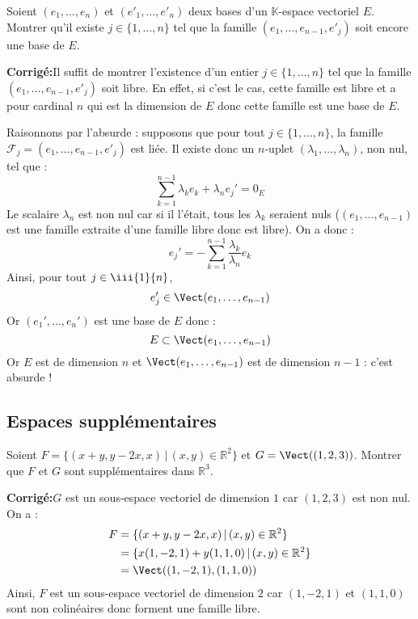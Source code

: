 \documentclass[a4paper,twoside,french,10pt]{VcCours}
\newcommand{\corr}{\textbf{Corrigé:}}
\begin{document}
\medskip

\begin{Exercice}{} Soient $(e_1 , \ldots ,e_n)$ et $(e'_1 , \ldots ,e'_n)$ deux bases d'un $\mathbb{K}$-espace vectoriel $E$. Montrer qu'il existe $j \in \lbrace 1, \ldots ,n \rbrace$ tel que la famille $(e_1 , \ldots ,e_{n - 1} ,e'_j)$ soit encore une base de $E$.
\end{Exercice}

\corr Il suffit de montrer l'existence d'un entier $j \in \lbrace 1, \ldots ,n \rbrace$ tel que la famille $(e_1 , \ldots ,e_{n - 1} ,e'_j)$ soit libre. En effet, si c'est le cas, cette famille est libre et a pour cardinal $n$ qui est la dimension de $E$ donc cette famille est une base de $E$.

\medskip

Raisonnons par l'absurde : supposons que pour tout $j \in \lbrace 1, \ldots ,n \rbrace$, la famille $\mathcal{F}_j=(e_1 , \ldots ,e_{n - 1} ,e'_j)$ est liée. Il existe donc un $n$-uplet $(\lambda_1, \ldots, \lambda_n)$, non nul, tel que :
$$ \sum_{k=1}^{n-1} \lambda_k e_k + \lambda_n e_j' = 0_E$$
Le scalaire $\lambda_n$ est non nul car si il l'était, tous les $\lambda_k$ seraient nuls ($(e_1, \ldots, e_{n-1})$ est une famille extraite d'une famille libre donc est libre). On a donc :
$$ e_j' = - \sum_{k=1}^{n-1} \dfrac{\lambda_k}{\lambda_n} e_k$$
Ainsi, pour tout $j \in \iii{1}{n}$,
$$ e_j' \in \Vect(e_1, \ldots, e_{n-1})$$
Or $(e_1', \ldots, e_n')$ est une base de $E$ donc :
$$ E \subset \Vect(e_1, \ldots, e_{n-1})$$
Or $E$ est de dimension $n$ et $\Vect(e_1, \ldots, e_{n-1})$ est de dimension $n-1$ : c'est absurde !

\medskip



\subsection{\large Espaces supplémentaires}

\medskip

\begin{Exercice}{} Soient $F= \lbrace (x+y,y-2x, x) \, \vert \,  (x,y) \in \mathbb{R}^2 \rbrace$ et $G = \Vect((1,2,3))$. Montrer que $F$ et $G$ sont supplémentaires dans $\mathbb{R}^3$.
\end{Exercice} 

\corr $G$ est un sous-espace vectoriel de dimension $1$ car $(1,2,3)$ est non nul. On a :
\begin{align*}
F & = \lbrace (x+y,y-2x, x) \, \vert \,  (x,y) \in \mathbb{R}^2 \rbrace \\
& = \lbrace x (1,-2,1) + y (1,1,0) \, \vert \, (x,y) \in \mathbb{R}^2 \rbrace \\
& = \Vect((1,-2,1),(1,1,0)) 
\end{align*}
Ainsi, $F$ est un sous-espace vectoriel de dimension $2$ car $(1,-2,1)$ et $(1,1,0)$ sont non colinéaires donc forment une famille libre.
\end{document}
